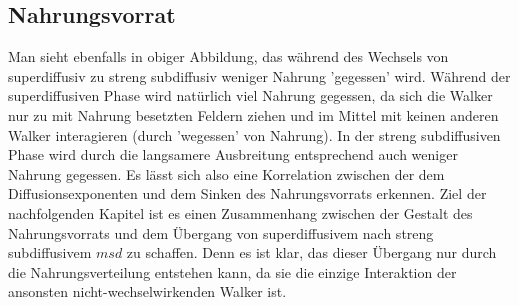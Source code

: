 \documentclass[a4paper, 12pt]{report}
\begin{document}
\newpage
\subsection{Nahrungsvorrat}
\noindent Man sieht ebenfalls in obiger Abbildung, das während des Wechsels von superdiffusiv zu streng subdiffusiv weniger Nahrung 'gegessen' wird. Während der superdiffusiven Phase wird natürlich viel Nahrung gegessen, da sich die Walker nur zu mit Nahrung besetzten Feldern ziehen und im Mittel mit keinen anderen Walker interagieren (durch 'wegessen' von Nahrung). In der streng subdiffusiven Phase wird durch die langsamere Ausbreitung entsprechend auch weniger Nahrung gegessen. Es lässt sich also eine Korrelation zwischen der dem Diffusionsexponenten und dem Sinken des Nahrungsvorrats erkennen.
\newpage
\noindent Ziel der nachfolgenden Kapitel ist es einen Zusammenhang zwischen der Gestalt des Nahrungsvorrats und dem Übergang von superdiffusivem nach streng subdiffusivem $msd$ zu schaffen. Denn es ist klar, das dieser Übergang nur durch die Nahrungsverteilung entstehen kann, da sie die einzige Interaktion der ansonsten nicht-wechselwirkenden Walker ist.
\end{document}
